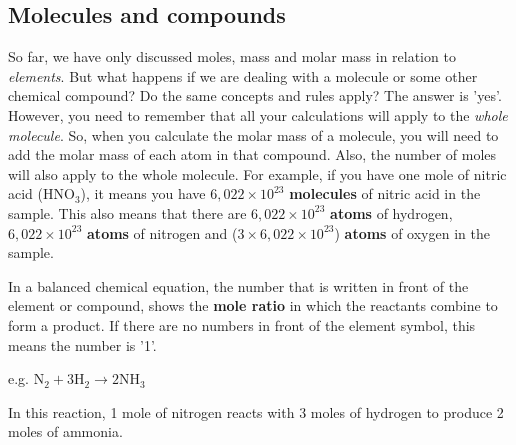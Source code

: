            \subsection{ Molecules and compounds}
            \nopagebreak
      \label{m38717*id278284}So far, we have only discussed moles, mass and molar mass in relation to \textsl{elements}. But what happens if we are dealing with a molecule or some other chemical compound? Do the same concepts and rules apply? The answer is 'yes'. However, you need to remember that all your calculations will apply to the \textsl{whole molecule}. So, when you calculate the molar mass of a molecule, you will need to add the molar mass of each atom in that compound. Also, the number of moles will also apply to the whole molecule. For example, if you have one mole of nitric acid ($\mathrm{HNO}{}_{3}$), it means you have $6,022\ensuremath{\times}{10}^{23}$ \textbf{molecules} of nitric acid in the sample. This also means that there are $6,022\ensuremath{\times}{10}^{23}$ \textbf{atoms} of hydrogen, $6,022\ensuremath{\times}{10}^{23}$ \textbf{atoms} of nitrogen and ($3\ensuremath{\times}6,022\ensuremath{\times}{10}^{23}$) \textbf{atoms} of oxygen in the sample.\par 
      \label{m38717*id278429}In a balanced chemical equation, the number that is written in front of the element or compound, shows the \textbf{mole ratio} in which the reactants combine to form a product. If there are no numbers in front of the element symbol, this means the number is '1'.\par 
      \label{m38717*id278442}e.g. ${\mathrm{N}}_{2}+3{\mathrm{H}}_{2}\to 2\mathrm{N}{\mathrm{H}}_{3}$\par 
      \label{m38717*id278488}In this reaction, 1 mole of nitrogen reacts with 3 moles of hydrogen to produce 2 moles of ammonia.\par 
\label{m38717*secfhsst!!!underscore!!!id566}\vspace{.5cm} 
      \noindent
